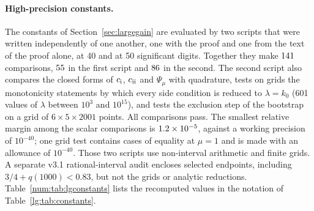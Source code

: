 \paragraph{High-precision constants.}
The constants of Section~\ref{sec:largegain} are evaluated by two scripts that were written independently of one another, one with the proof and one from the text of the proof alone, at 40 and at 50 significant digits. Together they make $141$ comparisons, $55$ in the first script and $86$ in the second. The second script also compares the closed forms of $c_{\rm i}$, $c_{\rm ii}$ and $\Psi_\mu$ with quadrature, tests on grids the monotonicity statements by which every side condition is reduced to $\lambda=k_0$ (601 values of $\lambda$ between $10^3$ and $10^{15}$), and tests the exclusion step of the bootstrap on a grid of $6\times5\times2001$ points. All comparisons pass. The smallest relative margin among the scalar comparisons is $1.2\times10^{-5}$, against a working precision of $10^{-40}$; one grid test contains cases of equality at $\mu=1$ and is made with an allowance of $10^{-40}$. Those two scripts use non-interval arithmetic and finite grids. A separate v3.1 rational-interval audit encloses selected endpoints, including $3/4+q(1000)<0.83$, but not the grids or analytic reductions. Table~\ref{num:tab:lgconstants} lists the recomputed values in the notation of Table~\ref{lg:tab:constants}.

\begin{table}[ht]
\centering\small
\caption{Constants of the proof of Theorem~\ref{thm:largegain}, recomputed at 40 significant digits and rounded (receipt \texttt{evidence/v3/v3\_largegain\_constants.json}).}\label{num:tab:lgconstants}

\end{table}

